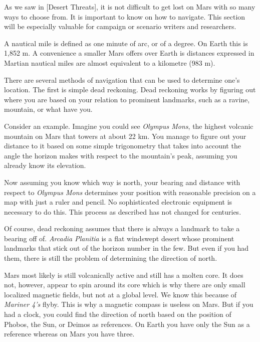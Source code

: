 

As we saw in [Desert Threats], it is not difficult to get lost on Mars with so many ways to choose from. It is important to know on how to navigate. This section will be especially valuable for campaign or scenario writers and researchers.

A nautical mile is defined as one minute of arc, or  of a degree. On Earth this is 1,852 m. A convenience a smaller Mars offers over Earth is distances expressed in Martian nautical miles are almost equivalent to a kilometre (983 m).

There are several methods of navigation that can be used to determine one's location. The first is simple dead reckoning. Dead reckoning works by figuring out where you are based on your relation to prominent landmarks, such as a ravine, mountain, or what have you. 

Consider an example. Imagine you could see {\it Olympus Mons}, the highest volcanic mountain on Mars that towers at about 22 km. You manage to figure out your distance to it based on some simple trigonometry that takes into account the angle the horizon makes with respect to the mountain's peak, assuming you already know its elevation. 

Now assuming you know which way is north, your bearing and distance with respect to {\it Olympus Mons} determines your position with reasonable precision on a map with just a ruler and pencil. No sophisticated electronic equipment is necessary to do this. This process as described has not changed for centuries.

Of course, dead reckoning assumes that there is always a landmark to take a bearing off of. {\it Arcadia Planitia} is a flat windswept desert whose prominent landmarks that stick out of the horizon number in the few. But even if you had them, there is still the problem of determining the direction of north. 

Mars most likely is still volcanically active and still has a molten core. It does not, however, appear to spin around its core which is why there are only small localized magnetic fields, but not at a global level. We know this because of {\it Mariner 4's} flyby. This is why a magnetic compass is useless on Mars. But if you had a clock, you could find the direction of north based on the position of Phobos, the Sun, or Deimos as references. On Earth you have only the Sun as a reference whereas on Mars you have three.

